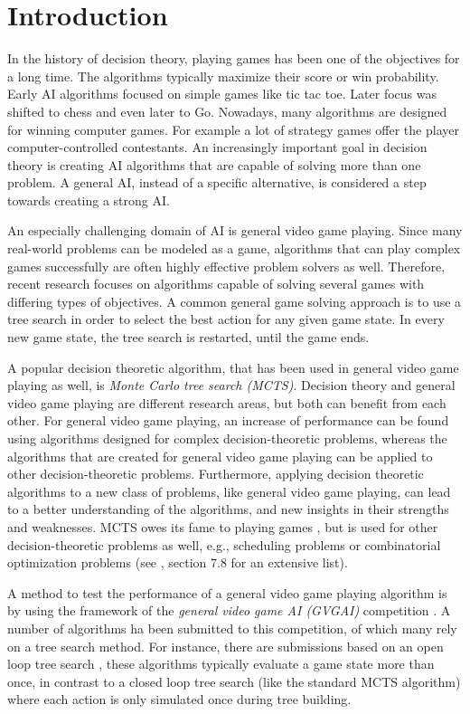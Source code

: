 \chapter{Introduction}
\label{sec:introduction}

In the history of decision theory, playing games has been one of the objectives
for a long time. The algorithms typically maximize their score or win
probability. Early AI algorithms focused on simple games like tic tac toe.
Later focus was shifted to chess and even later to Go. Nowadays, many algorithms
are designed for winning computer games. For example a lot of strategy games
offer the player computer-controlled contestants. 
An increasingly important goal in decision theory is creating AI algorithms that
are capable of solving more than one problem. A general AI, instead of a
specific alternative, is considered a step towards creating a strong AI.

An especially challenging domain of AI is general video game playing.  Since
many real-world problems can be modeled as a game, algorithms that can play
complex games successfully are often highly effective problem solvers as well.
Therefore, recent research focuses on algorithms capable of solving several
games with differing types of objectives. A common general game solving approach
is to use a tree search in order to select the best action for any given game
state. In every new game state, the tree search is restarted, until the game
ends. 

A popular decision theoretic algorithm, that has been used in general video game
playing as well, is \emph{Monte Carlo tree search (MCTS)}. Decision theory and
general video game playing are different research areas, but both can benefit
from each other. For general video game playing, an increase of performance can
be found using algorithms designed for complex decision-theoretic problems,
whereas the algorithms that are created for general video game playing can be
applied to other decision-theoretic problems.  Furthermore, applying decision
theoretic algorithms to a new class of problems, like general video game
playing, can lead to a better understanding of the algorithms, and new insights
in their strengths and weaknesses.  MCTS owes its fame to playing games
\cite{gelly2006modification}, but is used for other decision-theoretic problems
as well, e.g., scheduling problems or combinatorial optimization problems (see
\cite{browne2012survey}, section 7.8 for an extensive list). 

A method to test the performance of a general video game playing algorithm is
by using the framework of the \emph{general video game AI (GVGAI)} competition
\cite{perez2014}.  A number of algorithms ha been submitted to this competition,
of which many rely on a tree search method. For instance, there are submissions
based on an open loop tree search \cite{perez2015open}, these algorithms
typically evaluate a game state more than once, in contrast to a closed loop
tree search (like the standard MCTS algorithm) where each action is only
simulated once during tree building. 

